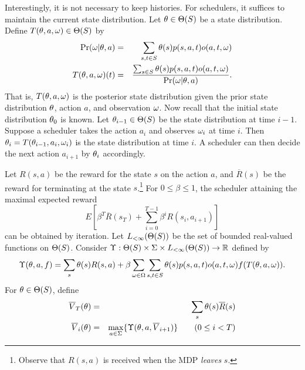 Interestingly, it is not necessary to keep
histories. For schedulers, it suffices to maintain the current state
distribution. Let $\theta \in \Theta (S)$ be a state distribution. Define
$T (\theta, a, \omega) \in \Theta (S)$ by
\begin{eqnarray}
  \Pr(\omega | \theta, a) & = &
    \sum_{s, t \in S} \theta (s) p (s, a, t) o (a, t, \omega)
\label{eqn:state-distribution-observation}
\\                             
  T (\theta, a, \omega) (t) & = &
    \frac{\sum_{s \in S} \theta (s) p (s, a, t) o (a, t, \omega)}
         {\Pr (\omega | \theta, a)}.
\label{eqn:state-distribution-successor}
\end{eqnarray}
That is, $T (\theta, a, \omega)$ is the posterior state distribution given
the prior state distribution $\theta$, action $a$, and observation
$\omega$. Now recall that the initial state distribution $\theta_0$ is
known. Let $\theta_{i-1} \in \Theta (S)$ be the state distribution at
time $i - 1$. Suppose a scheduler takes the action $a_{i}$ and
observes $\omega_{i}$ at time $i$. Then $\theta_i = T (\theta_{i-1}, a_i,
\omega_i)$ is the state distribution at time $i$. A
scheduler can then decide the next action $a_{i+1}$ by $\theta_i$
accordingly. 

Let $R (s, a)$ be the reward for the state $s$ on the action
$a$, and $\overline{R} (s)$ be the reward for terminating at the state
$s$.\footnote{Observe that $R (s, a)$ is received when the MDP
\emph{leaves} $s$.} For $0 \leq \beta \leq 1$, the scheduler attaining
the maximal expected reward
\[
  E[\beta^T \overline{R} (s_T) + \sum_{i=0}^{T-1} \beta^i R(s_i, a_{i+1})]
\]
can be obtained by iteration. Let $L_{< \infty} (\Theta (S))$ be the set of
bounded real-valued functions on $\Theta (S)$. Consider
$\Upsilon : \Theta (S) \times \Sigma \times L_{< \infty} (\Theta (S)) \rightarrow
\mathbb{R}$ defined by
\[
  \Upsilon (\theta, a, f) = \sum_s \theta (s) R (s, a) +
  \beta \sum_{\omega \in \Omega}
  \sum_{s, t \in S} \theta (s) p (s, a, t) o (a, t, \omega) f (T (\theta, a, \omega)).
\]
For $\theta \in \Theta (S)$, define
\begin{eqnarray}
  \overline{V}_{T} (\theta) & = & \sum_s \theta (s) \overline{R} (s)
\label{eqn:terminate-probability}
\\
  \overline{V}_{i} (\theta) & = &
    \max_{a \in \Sigma} \{ \Upsilon (\theta, a, \overline{V}_{i+1}) \} 
    \hspace{2em} (0 \leq i < T)
\label{eqn:max-probability}
\end{eqnarray}

